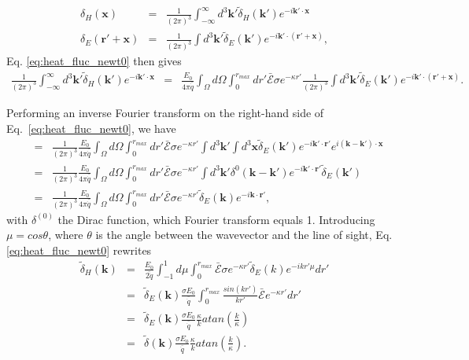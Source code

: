 \documentclass[twocolumns]{emulateapj}
\begin{document}
\begin{eqnarray}
  \label{eq:FT_delta}
  \delta_H(\mathbf{x})&=&\frac{1}{(2\pi)^3}\int_{-\infty}^{\infty} d^3\mathbf{k'} \tilde{\delta}_H(\mathbf{k'}) e^{-i\mathbf{k'}\cdot\mathbf{x}}\\ \nonumber
  \delta_E(\mathbf{r}'+\mathbf{x})&=&\frac{1}{(2\pi)^3}\int d^3\mathbf{k'} \tilde{\delta}_E(\mathbf{k'}) e^{-i\mathbf{k'}\cdot(\mathbf{r'}+\mathbf{x})},
\end{eqnarray}
Eq. \ref{eq:heat_fluc_newt0} then gives
\begin{eqnarray}
  \label{eq:heat_fluc_newt1}
\frac{1}{(2\pi)^3}\int_{-\infty}^{\infty} d^3\mathbf{k'} \tilde{\delta}_H(\mathbf{k'}) e^{-i\mathbf{k'}\cdot\mathbf{x}}&=&\frac{E_0}{4\pi\bar{\dot{q}}} \int_{\Omega}d\Omega\int_0^{r_{max}}  dr' \bar{\mathcal{E}}\sigma  e^{-\kappa r'}  \frac{1}{(2\pi)^3}\int d^3\mathbf{k'} \tilde{\delta}_E(\mathbf{k'}) e^{-i\mathbf{k'}\cdot(\mathbf{r'}+\mathbf{x})}.
\end{eqnarray}

Performing an inverse Fourier transform on the right-hand side of Eq.~\ref{eq:heat_fluc_newt0}, we have
\begin{eqnarray}
  \label{eq:right}
  &=& \frac{1}{(2\pi)^3} \frac{E_0}{4\pi\bar{\dot{q}}}\int_{\Omega}d\Omega\int_0^{r_{max}} dr'\bar{ \mathcal{E}}\sigma  e^{-\kappa r'} \int d^3\mathbf{k'}\int d^3\mathbf{x} \tilde{\delta}_E(\mathbf{k'})e^{-i\mathbf{k'}\cdot{\mathbf{r}'}} e^{i(\mathbf{k}-\mathbf{k'})\cdot\mathbf{x}} \\ \nonumber
  &=&\frac{1}{(2\pi)^3} \frac{E_0}{4\pi\bar{\dot{q}}} \int_{\Omega}d\Omega\int_0^{r_{max}}   dr' \bar{\mathcal{E}}\sigma  e^{-\kappa r'} \int d^3\mathbf{k'} \delta^{0}(\mathbf{k}-\mathbf{k}')e^{-i\mathbf{k'}\cdot{\mathbf{r}'}} \tilde{\delta}_E(\mathbf{k'})    \\ \nonumber
  &=&\frac{1}{(2\pi)^3} \frac{E_0}{4\pi\bar{\dot{q}}} \int_{\Omega}d\Omega\int_0^{r_{max}}  dr' \bar{ \mathcal{E}}\sigma  e^{-\kappa r'}  \tilde{\delta}_E(\mathbf{k}) e^{-i\mathbf{k}\cdot{\mathbf{r}'}}  ,
\end{eqnarray}
with $\delta^{(0)}$ the Dirac function, which Fourier transform equals 1. Introducing $\mu=cos\theta$, where $\theta$ is the angle between the wavevector and the line of sight, Eq. \ref{eq:heat_fluc_newt0} rewrites
\begin{eqnarray}
  \label{eq:heat_fluc_newt1}
  \tilde{\delta}_H(\mathbf{k})&=&  \frac{E_0}{\bar{2\dot{q}}} \int_{-1}^{1} d\mu \int_0^{r_{max}}  \bar{\mathcal{E}}\sigma  e^{-\kappa r'}  \tilde{\delta}_E(k) e^{-ikr'\mu}  dr'\\ \nonumber
&=&\tilde{\delta}_E(\mathbf{k})\frac{\sigma E_0}{\bar{\dot{q}}}\int_0^{r_{max}} \frac{sin(kr')}{kr'}   \bar{\mathcal{E}}  e^{-\kappa r'}   dr'\\ \nonumber
&=&\tilde{\delta}_E(\mathbf{k})\frac{\sigma E_0}{ \bar{\dot{q}}}\frac{\kappa}{k}  atan\left(\frac{k}{\kappa}\right)\\ \nonumber
&=&\tilde{\delta}(\mathbf{k})\frac{\sigma E_0}{ \bar{\dot{q}}}\frac{\kappa}{k}  atan\left(\frac{k}{\kappa}\right).\\ 
\end{eqnarray}
\end{document}
